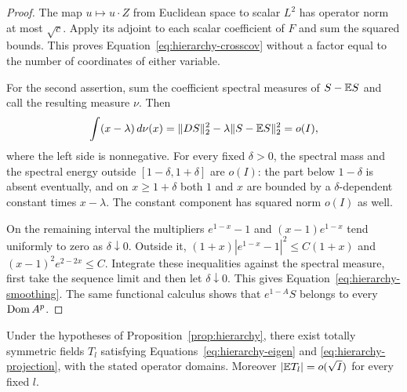 \begin{proof}
The map $u\mapsto u\cdot Z$ from Euclidean space to scalar $L^2$ has
operator norm at most $\sqrt c$.  Apply its adjoint to each scalar
coefficient of $F$ and sum the squared bounds.  This proves
Equation~\eqref{eq:hierarchy-crosscov} without a factor equal to the number
of coordinates of either variable.

For the second assertion, sum the coefficient spectral measures of
$S-\mathbb E S$ and call the resulting measure $\nu$.  Then
\[
 \int(x-\lambda)\,d\nu(x)
 =\|DS\|_2^2-\lambda\|S-\mathbb E S\|_2^2=o(I),
\]
where the left side is nonnegative.  For every fixed $\delta>0$, the
spectral mass and the spectral energy outside
$[1-\delta,1+\delta]$ are $o(I)$: the part below $1-\delta$ is absent
eventually, and on $x\ge1+\delta$ both $1$ and $x$ are bounded by a
$\delta$-dependent constant times $x-\lambda$.  The constant component
has squared norm $o(I)$ as well.

On the remaining interval the multipliers $e^{1-x}-1$ and
$(x-1)e^{1-x}$ tend uniformly to zero as $\delta\downarrow0$.  Outside
it, $(1+x)|e^{1-x}-1|^2\le C(1+x)$ and
$(x-1)^2e^{2-2x}\le C$.  Integrate these inequalities against the
spectral measure, first take the sequence limit and then let
$\delta\downarrow0$.  This gives Equation~\eqref{eq:hierarchy-smoothing}.
The same functional calculus shows that $e^{1-A}S$ belongs to every
$\operatorname{Dom} A^p$.
\end{proof}

\begin{lemma}
\label{lem:hierarchy-construction}
Under the hypotheses of Proposition~\ref{prop:hierarchy}, there exist
totally symmetric fields $T_l$ satisfying
Equations~\eqref{eq:hierarchy-eigen} and
\eqref{eq:hierarchy-projection}, with the stated operator domains.
Moreover $|\mathbb E T_l|=o(\sqrt I)$ for every fixed $l$.
\end{lemma}

